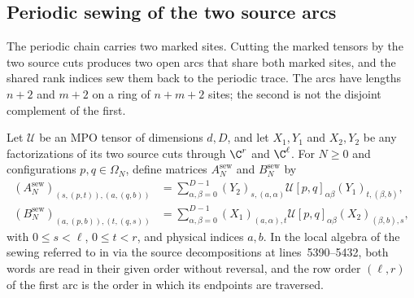 \subsection{Periodic sewing of the two source arcs}

The periodic chain carries two marked sites. Cutting the marked tensors by
the two source cuts produces two open arcs that share both marked sites,
and the shared rank indices sew them back to the periodic trace. The arcs
have lengths $n+2$ and $m+2$ on a ring of $n+m+2$ sites; the second is not
the disjoint complement of the first.

\begin{definition}
    \label{def:mpug_source_periodic_arcs}
    \leanok
    Let $\mathcal U$ be an MPO tensor of dimensions $d,D$, and let
    $X_1,Y_1$ and $X_2,Y_2$ be any factorizations of its two source cuts
    through $\C^r$ and $\C^\ell$. For $N\geq0$ and configurations
    $p,q\in\Omega_N$, define matrices $A^{\mathrm{sew}}_N$ and
    $B^{\mathrm{sew}}_N$ by
    \begin{align}
        (A^{\mathrm{sew}}_N)_{(s,(p,t)),(a,(q,b))}
         & =\sum_{\alpha,\beta=0}^{D-1}(Y_2)_{s,(a,\alpha)}
        \mathcal U[p,q]_{\alpha\beta}(Y_1)_{t,(\beta,b)},   \\
        (B^{\mathrm{sew}}_N)_{(a,(p,b)),(t,(q,s))}
         & =\sum_{\alpha,\beta=0}^{D-1}(X_1)_{(a,\alpha),t}
        \mathcal U[p,q]_{\alpha\beta}(X_2)_{(\beta,b),s},
    \end{align}
    with $0\leq s<\ell$, $0\leq t<r$, and physical indices $a,b$. In the
    local algebra of the sewing referred to in
    \cite[lines~5486--5487]{FrancoRubio2025MPUGauging} via the source
    decompositions at lines~5390--5432, both words are read in their given
    order without reversal, and the row order $(\ell,r)$ of the first arc is
    the order in which its endpoints are traversed.
\end{definition}

